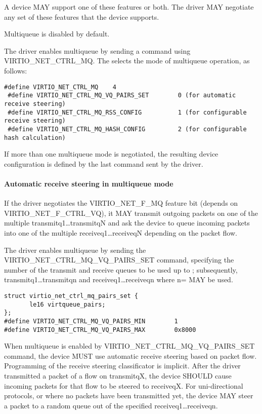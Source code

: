 A device MAY support one of these features or both. The driver MAY negotiate any set of these features that the device supports.

Multiqueue is disabled by default.

The driver enables multiqueue by sending a command using  VIRTIO_NET_CTRL_MQ. The  selects the mode of multiqueue operation, as follows:
\begin{lstlisting}
#define VIRTIO_NET_CTRL_MQ    4
 #define VIRTIO_NET_CTRL_MQ_VQ_PAIRS_SET        0 (for automatic receive steering)
 #define VIRTIO_NET_CTRL_MQ_RSS_CONFIG          1 (for configurable receive steering)
 #define VIRTIO_NET_CTRL_MQ_HASH_CONFIG         2 (for configurable hash calculation)
\end{lstlisting}

If more than one multiqueue mode is negotiated, the resulting device configuration is defined by the last command sent by the driver.

\paragraph{Automatic receive steering in multiqueue mode}\label{sec:Device Types / Network Device / Device Operation / Control Virtqueue / Automatic receive steering in multiqueue mode}

If the driver negotiates the VIRTIO_NET_F_MQ feature bit (depends on VIRTIO_NET_F_CTRL_VQ), it MAY transmit outgoing packets on one
of the multiple transmitq1\ldots transmitqN and ask the device to
queue incoming packets into one of the multiple receiveq1\ldots receiveqN
depending on the packet flow.

The driver enables multiqueue by
sending the VIRTIO_NET_CTRL_MQ_VQ_PAIRS_SET command, specifying
the number of the transmit and receive queues to be used up to
; subsequently,
transmitq1\ldots transmitqn and receiveq1\ldots receiveqn where
n= MAY be used.
\begin{lstlisting}
struct virtio_net_ctrl_mq_pairs_set {
       le16 virtqueue_pairs;
};
#define VIRTIO_NET_CTRL_MQ_VQ_PAIRS_MIN        1
#define VIRTIO_NET_CTRL_MQ_VQ_PAIRS_MAX        0x8000

\end{lstlisting}

When multiqueue is enabled by VIRTIO_NET_CTRL_MQ_VQ_PAIRS_SET command, the device MUST use automatic receive steering
based on packet flow. Programming of the receive steering
classificator is implicit. After the driver transmitted a packet of a
flow on transmitqX, the device SHOULD cause incoming packets for that flow to
be steered to receiveqX. For uni-directional protocols, or where
no packets have been transmitted yet, the device MAY steer a packet
to a random queue out of the specified receiveq1\ldots receiveqn.

